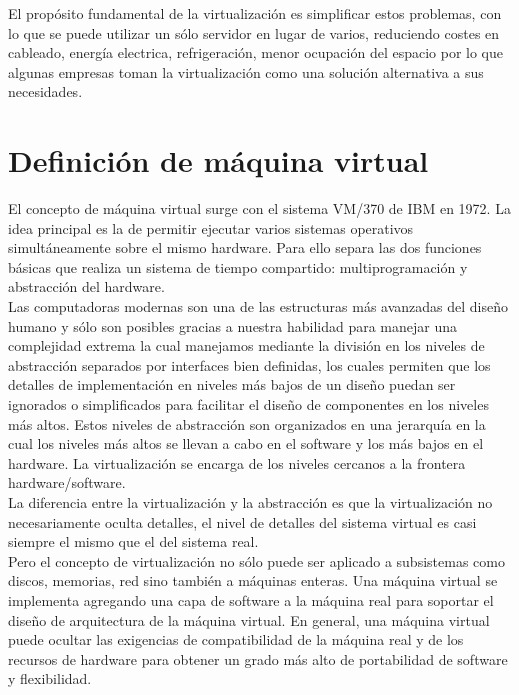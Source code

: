 \documentclass[10pt,a4paper,spanish]{report}
\begin{document}
  \noindent
  El propósito fundamental de la virtualización es simplificar estos problemas, con lo que se puede utilizar un sólo servidor en lugar de varios, reduciendo costes en cableado, energía electrica, refrigeración, menor ocupación del espacio por lo que algunas empresas toman la virtualización como una solución alternativa a sus necesidades.

  \section{Definición de máquina virtual}

  \noindent
  El concepto de máquina virtual surge con el sistema VM/370 de IBM en 1972. La idea principal es la de permitir ejecutar varios sistemas operativos simultáneamente sobre el mismo hardware. Para ello separa las dos funciones básicas que realiza un sistema de tiempo compartido: multiprogramación y abstracción del hardware. \\

  \noindent
  Las computadoras modernas son una de las estructuras más avanzadas del diseño humano y sólo son posibles gracias a nuestra habilidad para manejar una complejidad extrema la cual manejamos mediante la división en los niveles de abstracción separados por interfaces bien definidas, los cuales permiten que los detalles de implementación en niveles más bajos de un diseño puedan ser ignorados o simplificados para facilitar el diseño de componentes en los niveles más altos. Estos niveles de abstracción son organizados en una jerarquía en la cual los niveles más altos se llevan a cabo en el software y los más bajos en el hardware. La virtualización se encarga de los niveles cercanos a la frontera hardware/software. \\

  \noindent
  La diferencia entre la virtualización y la abstracción es que la virtualización no necesariamente oculta detalles, el nivel de detalles del sistema virtual es casi siempre el mismo que el del sistema real. \\

  \newpage
  \noindent
  Pero el concepto de virtualización no sólo puede ser aplicado a subsistemas como discos, memorias, red sino también a máquinas enteras. Una máquina virtual se implementa agregando una capa de software a la máquina real para soportar el diseño de arquitectura de la máquina virtual. En general, una máquina virtual puede ocultar las exigencias de compatibilidad de la máquina real y de los recursos de hardware para obtener un grado más alto de portabilidad de software y flexibilidad. \\
\end{document}
